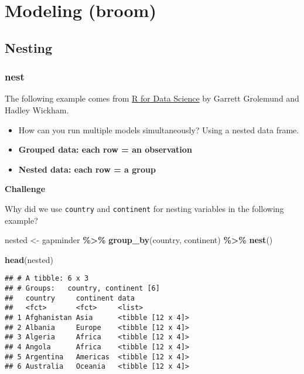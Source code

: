 \documentclass[
]{book}
\newenvironment{Shaded}{\begin{snugshade}}{\end{snugshade}}
\newcommand{\KeywordTok}[1]{\textcolor[rgb]{0.13,0.29,0.53}{\textbf{#1}}}
\newcommand{\NormalTok}[1]{#1}
\newcommand{\OperatorTok}[1]{\textcolor[rgb]{0.81,0.36,0.00}{\textbf{#1}}}
\newcommand{\StringTok}[1]{\textcolor[rgb]{0.31,0.60,0.02}{#1}}
\providecommand{\tightlist}{%
  \setlength{\itemsep}{0pt}\setlength{\parskip}{0pt}}
\begin{document}
\hypertarget{modeling-broom}{%
\section{Modeling (broom)}\label{modeling-broom}}

\hypertarget{nesting}{%
\subsection{Nesting}\label{nesting}}

\hypertarget{nest}{%
\subsubsection{nest}\label{nest}}

The following example comes from \href{https://r4ds.had.co.nz/many-models.html}{R for Data Science} by Garrett Grolemund and Hadley Wickham.

\begin{itemize}
\tightlist
\item
  How can you run multiple models simultaneously? Using a nested data frame.
\end{itemize}

\begin{itemize}
\item
  \textbf{Grouped data: each row = an observation}
\item
  \textbf{Nested data: each row = a group}
\end{itemize}

\textbf{Challenge}

Why did we use \texttt{country} and \texttt{continent} for nesting variables in the following example?

\begin{Shaded}
\begin{Highlighting}[]
\NormalTok{nested \textless{}{-}}\StringTok{ }\NormalTok{gapminder }\OperatorTok{\%\textgreater{}\%}
\StringTok{  }\KeywordTok{group\_by}\NormalTok{(country, continent) }\OperatorTok{\%\textgreater{}\%}
\StringTok{  }\KeywordTok{nest}\NormalTok{()}

\KeywordTok{head}\NormalTok{(nested)}
\end{Highlighting}
\end{Shaded}

\begin{verbatim}
## # A tibble: 6 x 3
## # Groups:   country, continent [6]
##   country     continent data             
##   <fct>       <fct>     <list>           
## 1 Afghanistan Asia      <tibble [12 x 4]>
## 2 Albania     Europe    <tibble [12 x 4]>
## 3 Algeria     Africa    <tibble [12 x 4]>
## 4 Angola      Africa    <tibble [12 x 4]>
## 5 Argentina   Americas  <tibble [12 x 4]>
## 6 Australia   Oceania   <tibble [12 x 4]>
\end{verbatim}
\end{document}
